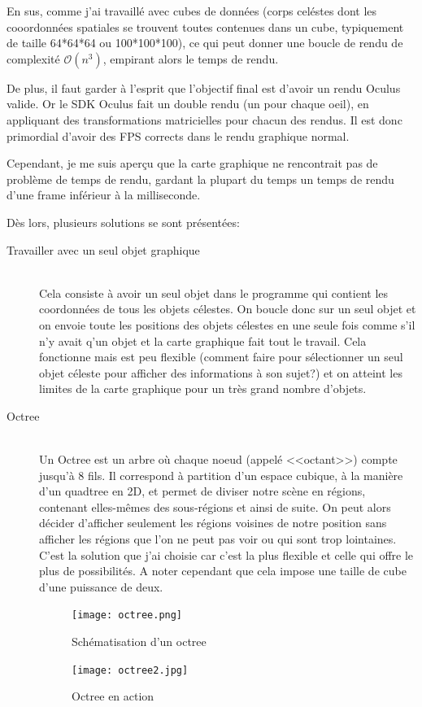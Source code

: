 \documentclass[a4paper,french,12pt]{article}
\begin{document}
		  En sus, comme j'ai travaillé avec cubes de données (corps celéstes dont les cooordonnées spatiales se trouvent toutes
		  contenues dans un cube, typiquement de taille 64*64*64 ou 100*100*100), ce qui peut donner une boucle de rendu
		  de complexité $\mathcal{O}(n^3)$, empirant alors le temps de rendu.
		  
		  De plus, il faut garder à l'esprit que l'objectif final est d'avoir un rendu Oculus valide. Or le
		  SDK Oculus fait un double rendu (un pour chaque oeil), en appliquant des transformations matricielles
		  pour chacun des rendus. Il est donc primordial d'avoir des FPS corrects dans le rendu graphique normal.
		  
		  Cependant, je me suis aperçu que la carte graphique ne rencontrait pas de problème de temps de rendu,
		  gardant la plupart du temps un temps de rendu d'une frame inférieur à la milliseconde.
		  
		  Dès lors, plusieurs solutions se sont présentées:
		  
		  \begin{description}
		   \item [Travailler avec un seul objet graphique]~\\ Cela consiste à avoir un seul objet dans le programme qui 
		   contient les coordonnées de tous les objets célestes. On boucle donc sur un seul objet et on envoie toute
		   les positions des objets célestes en une seule fois comme s'il n'y avait q'un objet et la carte
		   graphique fait tout le travail. Cela fonctionne mais est peu flexible (comment faire pour sélectionner
		   un seul objet céleste pour afficher des informations à son sujet?) et on atteint les limites de la
		   carte graphique pour un très grand nombre d'objets.
		   
		   \item [Octree]~\\ Un Octree est un arbre où chaque noeud (appelé <<octant>>) compte jusqu'à 8 fils. Il correspond à partition
		   d'un espace cubique, à la manière d'un quadtree en 2D, et permet de diviser notre scène en régions,
		   contenant elles-mêmes des sous-régions et ainsi de suite. On peut alors décider d'afficher seulement les
		   régions voisines de notre position sans afficher les régions que l'on ne peut pas voir ou qui sont
		   trop lointaines. C'est la solution que j'ai choisie car c'est la plus flexible et celle qui offre le
		   plus de possibilités. A noter cependant que cela impose une taille de cube d'une puissance de deux.
		   
		   \begin{figure}
			      \centering
				\texttt{[image: octree.png]}
			      \caption{Schématisation d'un octree}
			       
		    \end{figure} 
		    
		
			       
		\begin{figure} 
			\centering
				\texttt{[image: octree2.jpg]}
			      \caption{Octree en action}
		   
		\end{figure}
		   
		 \end{description}
\end{document}
